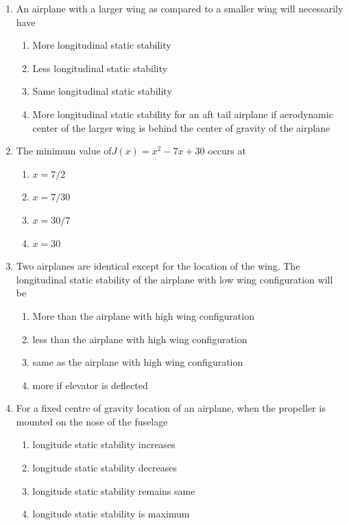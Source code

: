 \documentclass{article}
\begin{document}
\begin{enumerate}
\newpage
    \item An airplane with a larger wing as compared to a smaller wing will necessarily have 
    \begin{enumerate}
        \item More longitudinal static stability
        \item Less longitudinal static stability
        \item Same longitudinal static stability
        \item More longitudinal static stability for an aft tail airplane if aerodynamic center of the larger wing is behind the center of gravity of the airplane
    \end{enumerate}
        

    \item The minimum value of$J(x) = x^2 - 7x + 30$ occurs at
    \begin{multicols}{2}
    \begin{enumerate}
        \item $x = 7/2$ 
        \item $x = 7/30$ 
        \item $x = 30/7$ 
        \item $x = 30$
    \end{enumerate}
    \end{multicols}
        

    \item Two airplanes are identical except for the location of the wing. The longitudinal static stability of the airplane with low wing configuration will be 
    \begin{enumerate}
        \item More than the airplane with high wing configuration
        \item less than the airplane with high wing configuration
        \item same as the airplane with high wing configuration
        \item more if elevator is deflected
    \end{enumerate}
        

    \item For a fixed centre of gravity location of an airplane, when the propeller is mounted on the nose of the fuselage 
    \begin{enumerate}
        \item longitude static stability increases
        \item longitude static stability decreases
        \item longitude static stability remains same
        \item longitude static stability is maximum
    \end{enumerate}
        


\end{enumerate}
\end{document}
